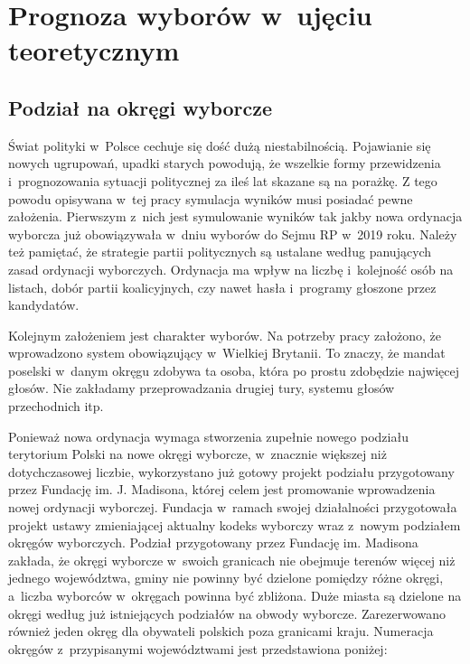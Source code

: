
\def\filename{Rozdział 2}

\chapter{Prognoza wyborów w~ujęciu teoretycznym}

\section{Podział na okręgi wyborcze}

Świat polityki w~Polsce cechuje się dość dużą niestabilnością. Pojawianie się nowych ugrupowań, upadki starych powodują, że wszelkie formy przewidzenia i~prognozowania sytuacji politycznej za ileś lat skazane są na porażkę. Z tego powodu opisywana w~tej pracy symulacja wyników musi posiadać pewne założenia. Pierwszym z~nich jest symulowanie wyników tak jakby nowa ordynacja wyborcza już obowiązywała w~dniu wyborów do Sejmu RP w~2019 roku. Należy też pamiętać, że strategie partii politycznych są ustalane według panujących zasad ordynacji wyborczych. Ordynacja ma wpływ na liczbę i~kolejność osób na listach, dobór partii koalicyjnych, czy nawet hasła i~programy głoszone przez kandydatów.

Kolejnym założeniem jest charakter wyborów. Na potrzeby pracy założono, że wprowadzono system obowiązujący w~Wielkiej Brytanii. To znaczy, że mandat poselski w~danym okręgu zdobywa ta osoba, która po prostu zdobędzie najwięcej głosów. Nie zakładamy przeprowadzania drugiej tury, systemu głosów przechodnich itp. 

Ponieważ nowa ordynacja wymaga stworzenia zupełnie nowego podziału terytorium Polski na nowe okręgi wyborcze, w~znacznie większej niż dotychczasowej liczbie, wykorzystano już gotowy projekt podziału przygotowany przez Fundację im. J. Madisona, której celem jest promowanie wprowadzenia nowej ordynacji wyborczej. Fundacja w~ramach swojej działalności przygotowała projekt ustawy zmieniającej aktualny kodeks wyborczy wraz z~nowym podziałem okręgów wyborczych. Podział przygotowany przez Fundację im. Madisona zakłada, że okręgi wyborcze w~swoich granicach nie obejmuje terenów więcej niż jednego województwa, gminy nie powinny być dzielone pomiędzy różne okręgi, a~liczba wyborców w~okręgach powinna być zbliżona. Duże miasta są dzielone na okręgi według już istniejących podziałów na obwody wyborcze. Zarezerwowano również jeden okręg dla obywateli polskich poza granicami kraju. Numeracja okręgów z~przypisanymi województwami jest przedstawiona poniżej:

